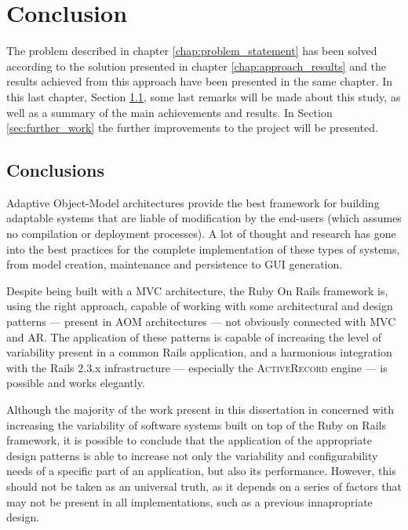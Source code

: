\chapter{Conclusion}\label{chap:conclusion}

The problem described in chapter \ref{chap:problem_statement} has been solved according to the solution presented in chapter \ref{chap:approach_results} and the results achieved from this approach have been presented in the same chapter. In this last chapter, Section \ref{sec:conclusions}, some last remarks will be made about this study, as well as a summary of the main achievements and results. In Section \ref{sec:further_work} the further improvements to the project will be presented.

\section{Conclusions}\label{sec:conclusions}

Adaptive Object-Model architectures provide the best framework for building adaptable systems that are liable of modification by the end-users (which assumes no compilation or deployment processes). A lot of thought and research has gone into the best practices for the complete implementation of these types of systems, from model creation, maintenance and persistence to GUI generation.

Despite being built with a MVC architecture, the Ruby On Rails framework is, using the right approach, capable of working with some architectural and design patterns --- present in AOM architectures --- not obviously connected with MVC and AR. The application of these patterns is capable of increasing the level of variability present in a common Rails application, and a harmonious integration with the Rails 2.3.x infrastructure --- especially the \textsc{ActiveRecord} engine --- is possible and works elegantly.

Although the majority of the work present in this dissertation in concerned with increasing the variability of software systems built on top of the Ruby on Rails framework, it is possible to conclude that the application of the appropriate design patterns is able to increase not only the variability and configurability needs of a specific part of an application, but also its performance. However, this should not be taken as an universal truth, as it depends on a series of factors that may not be present in all implementations, such as a previous innapropriate design.

